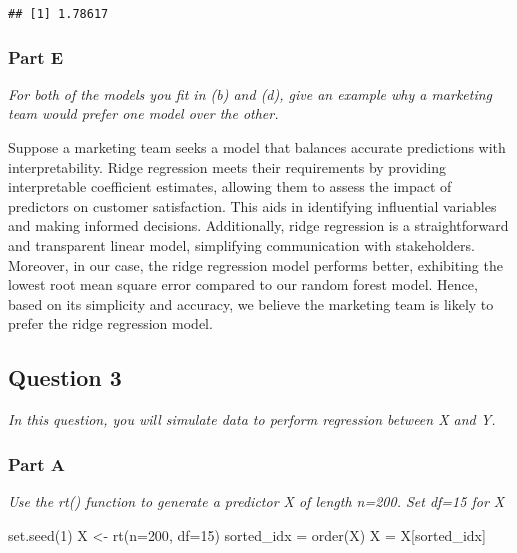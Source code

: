 \documentclass[
]{article}
\newenvironment{Shaded}{\begin{snugshade}}{\end{snugshade}}
\newcommand{\AttributeTok}[1]{\textcolor[rgb]{0.77,0.63,0.00}{#1}}
\newcommand{\DecValTok}[1]{\textcolor[rgb]{0.00,0.00,0.81}{#1}}
\newcommand{\FunctionTok}[1]{\textcolor[rgb]{0.00,0.00,0.00}{#1}}
\newcommand{\NormalTok}[1]{#1}
\newcommand{\OtherTok}[1]{\textcolor[rgb]{0.56,0.35,0.01}{#1}}
\begin{document}
\begin{verbatim}
## [1] 1.78617
\end{verbatim}

\hypertarget{part-e}{%
\subsubsection{Part E}\label{part-e}}

\emph{For both of the models you fit in (b) and (d), give an example why
a marketing team would prefer one model over the other.}

Suppose a marketing team seeks a model that balances accurate
predictions with interpretability. Ridge regression meets their
requirements by providing interpretable coefficient estimates, allowing
them to assess the impact of predictors on customer satisfaction. This
aids in identifying influential variables and making informed decisions.
Additionally, ridge regression is a straightforward and transparent
linear model, simplifying communication with stakeholders. Moreover, in
our case, the ridge regression model performs better, exhibiting the
lowest root mean square error compared to our random forest model.
Hence, based on its simplicity and accuracy, we believe the marketing
team is likely to prefer the ridge regression model.

\hypertarget{question-3}{%
\subsection{Question 3}\label{question-3}}

\emph{In this question, you will simulate data to perform regression
between X and Y.}

\hypertarget{part-a-2}{%
\subsubsection{Part A}\label{part-a-2}}

\emph{Use the rt() function to generate a predictor X of length n=200.
Set df=15 for X}

\begin{Shaded}
\begin{Highlighting}[]
\FunctionTok{set.seed}\NormalTok{(}\DecValTok{1}\NormalTok{)}
\NormalTok{X }\OtherTok{\textless{}{-}} \FunctionTok{rt}\NormalTok{(}\AttributeTok{n=}\DecValTok{200}\NormalTok{, }\AttributeTok{df=}\DecValTok{15}\NormalTok{)}
\NormalTok{sorted\_idx }\OtherTok{=} \FunctionTok{order}\NormalTok{(X)}
\NormalTok{X }\OtherTok{=}\NormalTok{ X[sorted\_idx]}
\end{Highlighting}
\end{Shaded}
\end{document}
